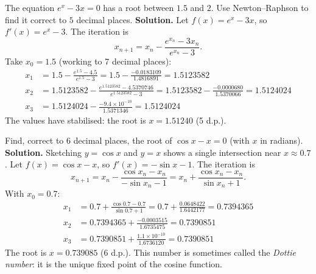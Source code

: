 \documentclass[11pt]{article}
\begin{document}
\begin{exoresolu}
The equation $e^x - 3x = 0$ has a root between $1.5$ and $2$. Use Newton--Raphson to find it correct to $5$ decimal places.
\tcblower
\textbf{Solution.} Let $f(x) = e^x - 3x$, so $f'(x) = e^x - 3$. The iteration is
\[ x_{n+1} = x_n - \frac{e^{x_n} - 3x_n}{e^{x_n} - 3}. \]
Take $x_0 = 1.5$ (working to 7 decimal places):
\begin{align*}
x_1 &= 1.5 - \frac{e^{1.5} - 4.5}{e^{1.5} - 3} = 1.5 - \frac{-0.0183109}{1.4816891} = 1.5123582 \\
x_2 &= 1.5123582 - \frac{e^{1.5123582} - 4.5370746}{e^{1.5123582} - 3} = 1.5123582 - \frac{-0.0000680}{1.5370066} = 1.5124024 \\
x_3 &= 1.5124024 - \frac{-9.4\times 10^{-10}}{1.5371346} = 1.5124024
\end{align*}
The values have stabilised: the root is $\boxed{x = 1.51240}$ (5 d.p.).
\end{exoresolu}

\begin{exoresolu}
Find, correct to 6 decimal places, the root of $\cos x - x = 0$ (with $x$ in radians).
\tcblower
\textbf{Solution.} Sketching $y=\cos x$ and $y=x$ shows a single intersection near $x \approx 0.7$. Let $f(x) = \cos x - x$, so $f'(x) = -\sin x - 1$. The iteration is
\[ x_{n+1} = x_n - \frac{\cos x_n - x_n}{-\sin x_n - 1} = x_n + \frac{\cos x_n - x_n}{\sin x_n + 1}. \]
With $x_0 = 0.7$:
\begin{align*}
x_1 &= 0.7 + \frac{\cos 0.7 - 0.7}{\sin 0.7 + 1} = 0.7 + \frac{0.0648422}{1.6442177} = 0.7394365 \\
x_2 &= 0.7394365 + \frac{-0.0003515}{1.6735475} = 0.7390851 \\
x_3 &= 0.7390851 + \frac{1.1\times 10^{-10}}{1.6736120} = 0.7390851
\end{align*}
The root is $\boxed{x = 0.739085}$ (6 d.p.). This number is sometimes called the \emph{Dottie number}: it is the unique fixed point of the cosine function.
\end{exoresolu}
\end{document}
